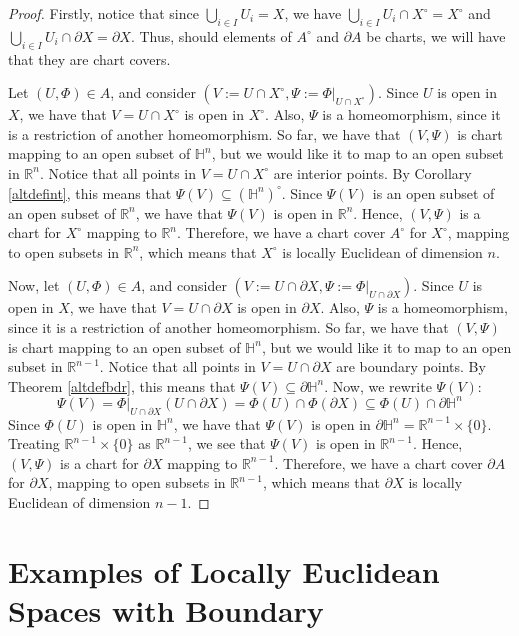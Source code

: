 \documentclass{article}
\newcommand{\R}{\mathbb{R}}
\renewcommand{\H}{\mathbb{H}}
\newcommand{\bdr}{\partial}
\theoremstyle{plain} %
\numberwithin{thm}{section} %
\theoremstyle{definition} %
\begin{document}
\begin{proof}
Firstly, notice that since $\bigcup_{i \in I} U_i = X$, we have $\bigcup_{i \in I} U_i \cap X^\circ = X^\circ$ and $\bigcup_{i \in I} U_i \cap \bdr X = \bdr X$. Thus, should elements of $A^\circ$ and $\bdr A$ be charts, we will have that they are chart covers.

Let $(U, \Phi) \in A$, and consider $(V := U \cap X^\circ, \Psi := \Phi|_{U \cap X^\circ})$. Since $U$ is open in $X$, we have that $V = U \cap X^\circ$ is open in $X^\circ$. Also, $\Psi$ is a homeomorphism, since it is a restriction of another homeomorphism. So far, we have that $(V, \Psi)$ is chart mapping to an open subset of $\H^n$, but we would like it to map to an open subset in $\R^n$. Notice that all points in $V = U \cap X^\circ$ are interior points. By Corollary \ref{altdefint}, this means that $\Psi(V) \subseteq (\H^n)^\circ$. Since $\Psi(V)$ is an open subset of an open subset of $\R^n$, we have that $\Psi(V)$ is open in $\R^n$. Hence, $(V, \Psi)$ is a chart for $X^\circ$ mapping to $\R^n$. Therefore, we have a chart cover $A^\circ$ for $X^\circ$, mapping to open subsets in $\R^n$, which means that $X^\circ$ is locally Euclidean of dimension $n$.

Now, let $(U, \Phi) \in A$, and consider $(V := U \cap \bdr X, \Psi := \Phi|_{U \cap \bdr X})$. Since $U$ is open in $X$, we have that $V = U \cap \bdr X$ is open in $\bdr X$. Also, $\Psi$ is a homeomorphism, since it is a restriction of another homeomorphism. So far, we have that $(V, \Psi)$ is chart mapping to an open subset of $\H^n$, but we would like it to map to an open subset in $\R^{n - 1}$. Notice that all points in $V = U \cap \bdr X$ are boundary points. By Theorem \ref{altdefbdr}, this means that $\Psi(V) \subseteq \bdr\H^n$. Now, we rewrite $\Psi(V)$:
\[
    \Psi(V) = \Phi|_{U \cap \bdr X}(U \cap \bdr X) = \Phi(U) \cap \Phi(\bdr X) \subseteq \Phi(U) \cap \bdr\H^n
\]
Since $\Phi(U)$ is open in $\H^n$, we have that $\Psi(V)$ is open in $\bdr\H^n = \R^{n - 1} \times \{0\}$. Treating $\R^{n - 1} \times \{0\}$ as $\R^{n - 1}$, we see that $\Psi(V)$ is open in $\R^{n - 1}$. Hence, $(V, \Psi)$ is a chart for $\bdr X$ mapping to $\R^{n - 1}$. Therefore, we have a chart cover $\bdr A$ for $\bdr X$, mapping to open subsets in $\R^{n - 1}$, which means that $\bdr X$ is locally Euclidean of dimension $n - 1$.
\end{proof}

\section{Examples of Locally Euclidean Spaces with Boundary}
\end{document}
